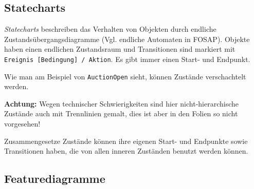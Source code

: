 \documentclass{panikzettel}
\begin{document}
\subsection{Statecharts}
\label{sec:statecharts}

\emph{Statecharts} beschreiben das Verhalten von Objekten durch endliche  Zustandsübergangsdiagramme (Vgl. endliche Automaten in FOSAP).
Objekte haben einen endlichen Zustandsraum und Transitionen sind markiert mit \lstinline{Ereignis [Bedingung] / Aktion}.
Es gibt immer einen Start- und Endpunkt.


Wie man am Beispiel von \lstinline{AuctionOpen} sieht, können Zustände verschachtelt werden.

\textbf{Achtung:} Wegen technischer Schwierigkeiten sind hier nicht-hierarchische Zustände auch mit Trennlinien gemalt, dies ist aber in den Folien so nicht vorgesehen!

Zusammengesetze Zustände können ihre eigenen Start- und Endpunkte sowie Transitionen haben, die von allen inneren Zuständen benutzt werden können.

\subsection{Featurediagramme}
\end{document}
